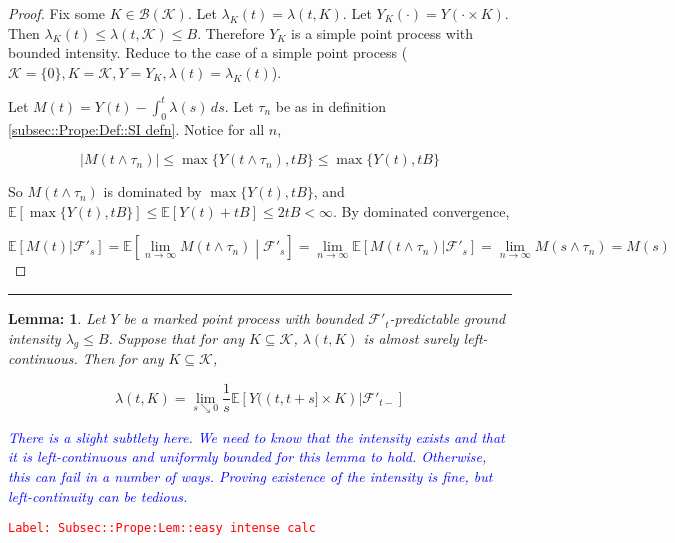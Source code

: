 \documentclass[12pt]{article}
\newcommand{\mb}{\mathbb}
\newcommand{\mc}{\mathcal}
\newcommand{\ms}{\mathscr}
\newcommand{\ra}{\rightarrow}
\newcommand{\tr}{\textcolor{red}}
\newcommand{\tb}{\textcolor{blue}}
\newcommand{\labe}[1]{\tr{\texttt{Label: #1}}}
\newcommand{\lin}{\rule{\linewidth}{0.4 pt}}
\newcommand{\ex}[1]{\mb{E}\left[#1\right]}			%
\newtheorem{lem}[thms]{Lemma: }
\begin{document}
\begin{proof}
Fix some \(K \in \ms{B}(\mc{K})\). Let \(\lambda_K(t) = \lambda(t,K)\). Let \(Y_K(\cdot) = Y(\cdot\times K)\). Then \(\lambda_K(t) \leq \lambda(t,\mc{K}) \leq B\). Therefore \(Y_K\) is a simple point process with bounded intensity. Reduce to the case of a simple point process (\(\mc{K} = \{0\}, K = \mc{K}, Y = Y_K,\lambda(t) = \lambda_K(t)\)).

Let \(M(t) = Y(t) - \int_0^t \lambda(s)\,ds\). Let \(\tau_n\) be as in definition \ref{subsec::Prope:Def::SI defn}. Notice for all \(n\),

\[|M(t\wedge \tau_n)| \leq \max\{Y(t\wedge \tau_n),tB\}\leq \max\{Y(t),tB\}\]

So \(M(t\wedge\tau_n)\) is dominated by \(\max\{Y(t),tB\}\), and \(\ex{\max\{Y(t),tB\}} \leq \ex{Y(t) + tB} \leq 2tB < \infty\). By dominated convergence,

\[\ex{M(t)|\mc{F}'_s} = \ex{\lim_{n\ra\infty} M(t\wedge \tau_n)\middle|\mc{F}'_s} = \lim_{n\ra\infty}\ex{M(t\wedge \tau_n)|\mc{F}'_s} = \lim_{n\ra\infty} M(s\wedge \tau_n) = M(s)\]
\end{proof}

\lin

\begin{lem}
Let \(Y\) be a marked point process with bounded \(\mc{F}'_t\)-predictable ground intensity \(\lambda_g\leq B\). Suppose that for any \(K \subseteq \mc{K}\), \(\lambda(t,K)\) is almost surely left-continuous. Then for any \(K \subseteq \mc{K}\),

\[\lambda(t,K) = \lim_{s\searrow 0}\frac{1}{s}\ex{Y((t,t+s]\times K)|\mc{F}'_{t-}}\]

\tb{There is a slight subtlety here. We need to know that the intensity exists and that it is left-continuous and uniformly bounded for this lemma to hold. Otherwise, this can fail in a number of ways. Proving existence of the intensity is fine, but left-continuity can be tedious.}

\label{Subsec::Prope:Lem::easy intense calc}
\end{lem}
\labe{Subsec::Prope:Lem::easy intense calc}
\end{document}
